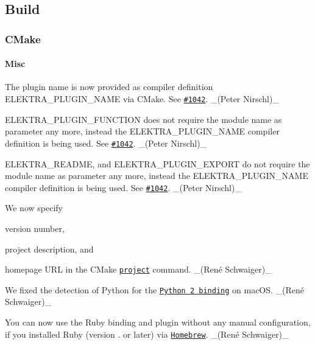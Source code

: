 \subsection*{Build}

\subsubsection*{C\+Make}

\paragraph*{Misc}


\begin{DoxyItemize}
\item The plugin name is now provided as compiler definition {\ttfamily E\+L\+E\+K\+T\+R\+A\+\_\+\+P\+L\+U\+G\+I\+N\+\_\+\+N\+A\+ME} via C\+Make. See \href{https://issues.libelektra.org/1042}{\tt \#1042}. \+\_\+(\+Peter Nirschl)\+\_\+
\item {\ttfamily E\+L\+E\+K\+T\+R\+A\+\_\+\+P\+L\+U\+G\+I\+N\+\_\+\+F\+U\+N\+C\+T\+I\+ON} does not require the module name as parameter any more, instead the {\ttfamily E\+L\+E\+K\+T\+R\+A\+\_\+\+P\+L\+U\+G\+I\+N\+\_\+\+N\+A\+ME} compiler definition is being used. See \href{https://issues.libelektra.org/1042}{\tt \#1042}. \+\_\+(\+Peter Nirschl)\+\_\+
\item {\ttfamily E\+L\+E\+K\+T\+R\+A\+\_\+\+R\+E\+A\+D\+ME}, and {\ttfamily E\+L\+E\+K\+T\+R\+A\+\_\+\+P\+L\+U\+G\+I\+N\+\_\+\+E\+X\+P\+O\+RT} do not require the module name as parameter any more, instead the {\ttfamily E\+L\+E\+K\+T\+R\+A\+\_\+\+P\+L\+U\+G\+I\+N\+\_\+\+N\+A\+ME} compiler definition is being used. See \href{https://issues.libelektra.org/1042}{\tt \#1042}. \+\_\+(\+Peter Nirschl)\+\_\+
\item We now specify
\begin{DoxyItemize}
\item version number,
\item project description, and
\item homepage U\+RL in the C\+Make \href{https://cmake.org/cmake/help/latest/command/project.html}{\tt {\ttfamily project}} command. \+\_\+(René Schwaiger)\+\_\+
\end{DoxyItemize}
\item We fixed the detection of Python for the \href{https://www.libelektra.org/bindings/swig_python2}{\tt Python 2 binding} on mac\+OS. \+\_\+(René Schwaiger)\+\_\+
\item You can now use the Ruby binding and plugin without any manual configuration, if you installed Ruby (version {.} or later) via \href{http://brew.sh}{\tt Homebrew}. \+\_\+(René Schwaiger)\+\_\+
\end{DoxyItemize}

